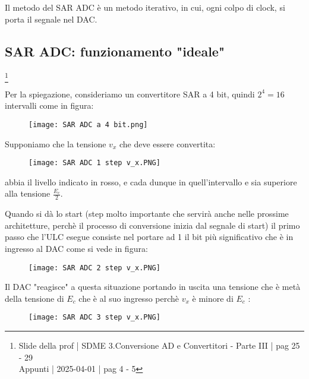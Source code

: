 Il metodo del SAR ADC è un metodo iterativo, in cui, ogni colpo di clock, si porta il segnale nel DAC. \newline 

\newpage 

\subsection{SAR ADC: funzionamento "ideale"}
\footnote{Slide della prof | SDME 3.Conversione AD e Convertitori - Parte III | pag 25 - 29 \\  
Appunti | 2025-04-01 | pag 4 - 5 }

Per la spiegazione, consideriamo un convertitore SAR a 4 bit, quindi $2^{4} = 16$ intervalli come in figura: 

\begin{figure}[h]
    \centering
    \texttt{[image: SAR ADC a 4 bit.png]}
\end{figure}

Supponiamo che la tensione $v_x$ che deve essere convertita: 

\begin{figure}[h]
    \centering
    \texttt{[image: SAR ADC 1 step v\_x.PNG]}
\end{figure}

abbia il livello indicato in rosso, e cada dunque in quell'intervallo e sia superiore alla tensione $\frac{E_c}{2}$. \newline 

Quando si dà lo start (step molto importante che servirà anche nelle prossime architetture, perchè il processo di conversione inizia dal segnale di start) 
il primo passo che l'ULC esegue consiste nel portare ad 1 il bit più significativo che è in ingresso al DAC come si vede in figura: 

\begin{figure}[h]
    \centering
    \texttt{[image: SAR ADC 2 step v\_x.PNG]}
\end{figure}

Il DAC "reagisce" a questa situazione portando in uscita una tensione che è metà della tensione di $E_c$ che è al suo ingresso perchè $v_x$ è minore di $E_c$ : 

\begin{figure}[h]
    \centering
    \texttt{[image: SAR ADC 3 step v\_x.PNG]}
\end{figure}

\newpage 

